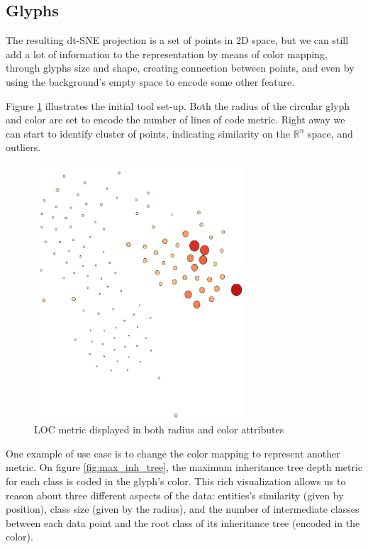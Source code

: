 \subsection{Glyphs} \label{sec:glyphs}
The resulting dt-SNE projection is a set of points in 2D space, but we can still add a lot of information to the representation by means of color mapping, through glyphs size and shape, creating connection between points, and even by using the background's empty space to encode some other feature.

Figure \ref{fig:count_line} illustrates the initial tool set-up. Both the radius of the circular glyph and color are set to encode the number of lines of code metric. Right away we can start to identify cluster of points, indicating similarity on the $\mathbb{R}^{n}$ space, and outliers.

\begin{figure}[H]
  \centering
  \includegraphics[width=0.7\textwidth]{figures/count_line.png}
  \caption{LOC metric displayed in both radius and color attributes}
  \label{fig:count_line}
\end{figure}

One example of use case is to change the color mapping to represent another metric. On figure \ref{fig:max_inh_tree}, the maximum inheritance tree depth metric for each class is coded in the glyph's color. This rich visualization allows us to reason about three different aspects of the data: entities's similarity (given by position), class size (given by the radius), and the number of intermediate classes between each data point and the root class of its inheritance tree (encoded in the color).

